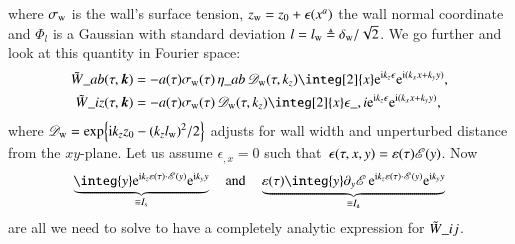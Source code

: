     where $\sigma_\mathrm{w}$ is the wall's surface tension, $z\ped{w} = z_0 + \epsilon(x\^a)$ the wall normal coordinate and $\varPhi_l$ is a Gaussian with standard deviation $l= l_\mathrm{w} \triangleq \delta_\mathrm{w}/\sqrt{2}$. We go further and look at this quantity in Fourier space:
    \begin{equation}\label{eq:pertwalls:gws:Ft_SE_tensor_general}
        \begin{split}
            \Twf\_{ab}(\tau, \vec{k}) &=  -a (\tau)\sigma\ped{w}(\tau)  \, \eta\_{ab} \, \mathscr{D}\ped{w}(\tau,k_z) \integ[2]{x} \eu[\im k_z \epsilon] \eu[\im (k_x x+k_y y)], \\
            \Twf\_{iz}(\tau, \vec{k})
            &= -a (\tau)\sigma\ped{w}(\tau) \,\mathscr{D}\ped{w}(\tau, k_z)  \integ[2]{x} \epsilon\_{,i}  \eu[\im k_z \epsilon] \eu[\im (k_x x+k_y y)],%
         \end{split}
    \end{equation}
    where $\mathscr{D}_\mathrm{w}= \exp{ \ensuremath{\mathrm{i}}k_z z_0-{(k_z l\ensuremath{_\mathrm{w}})}^2/2 }$ adjusts for wall width and unperturbed distance from the $xy$-plane. %
    Let us assume $\epsilon_{,x}=0$ such that~$\epsilon(\tau,x,y)=\varepsilon(\tau)\mathscr{E}(y)$. %
    Now
    \begin{equation}\label{eq:pertwalls:gws:def_I_s_and_a}
        \underbrace{\integ{y} \eu[\im k_z \varepsilon(\tau) \cdot \sppt(y)] \eu[\im k_y y]}_{\equiv  I\ped{s}}  \quad \text{and}\quad %
        \underbrace{\varepsilon(\tau)\integ{y} \partial_y \sppt\, \eu[\im k_z \varepsilon(\tau) \cdot \sppt(y)] \eu[\im k_y y]}_{\equiv I\ped{a}}
    \end{equation}
    are all we need to solve to have a completely analytic expression for $\tilde{W}\_{ij}$.%


